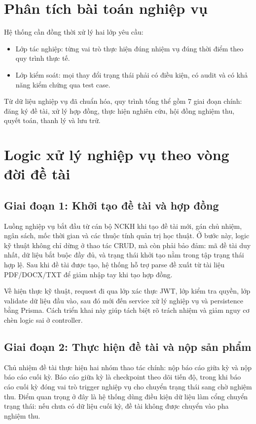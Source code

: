 \documentclass[12pt,a4paper]{report}
\begin{document}
\section{Phân tích bài toán nghiệp vụ}
Hệ thống cần đồng thời xử lý hai lớp yêu cầu:
\begin{itemize}[leftmargin=1.2cm]
\item Lớp tác nghiệp: từng vai trò thực hiện đúng nhiệm vụ đúng thời điểm theo quy trình thực tế.
\item Lớp kiểm soát: mọi thay đổi trạng thái phải có điều kiện, có audit và có khả năng kiểm chứng qua test case.
\end{itemize}

Từ dữ liệu nghiệp vụ đã chuẩn hóa, quy trình tổng thể gồm 7 giai đoạn chính: đăng ký đề tài, xử lý hợp đồng, thực hiện nghiên cứu, hội đồng nghiệm thu, quyết toán, thanh lý và lưu trữ.

\section{Logic xử lý nghiệp vụ theo vòng đời đề tài}
\subsection{Giai đoạn 1: Khởi tạo đề tài và hợp đồng}
Luồng nghiệp vụ bắt đầu từ cán bộ NCKH khi tạo đề tài mới, gán chủ nhiệm, ngân sách, mốc thời gian và các thuộc tính quản trị học thuật. Ở bước này, logic kỹ thuật không chỉ dừng ở thao tác CRUD, mà còn phải bảo đảm: mã đề tài duy nhất, dữ liệu bắt buộc đầy đủ, và trạng thái khởi tạo nằm trong tập trạng thái hợp lệ. Sau khi đề tài được tạo, hệ thống hỗ trợ parse đề xuất từ tài liệu PDF/DOCX/TXT để giảm nhập tay khi tạo hợp đồng.

Về hiện thực kỹ thuật, request đi qua lớp xác thực JWT, lớp kiểm tra quyền, lớp validate dữ liệu đầu vào, sau đó mới đến service xử lý nghiệp vụ và persistence bằng Prisma. Cách triển khai này giúp tách biệt rõ trách nhiệm và giảm nguy cơ chèn logic sai ở controller.

\subsection{Giai đoạn 2: Thực hiện đề tài và nộp sản phẩm}
Chủ nhiệm đề tài thực hiện hai nhóm thao tác chính: nộp báo cáo giữa kỳ và nộp báo cáo cuối kỳ. Báo cáo giữa kỳ là checkpoint theo dõi tiến độ, trong khi báo cáo cuối kỳ đóng vai trò trigger nghiệp vụ cho chuyển trạng thái sang chờ nghiệm thu. Điểm quan trọng ở đây là hệ thống dùng điều kiện dữ liệu làm cổng chuyển trạng thái: nếu chưa có dữ liệu cuối kỳ, đề tài không được chuyển vào pha nghiệm thu.
\end{document}
